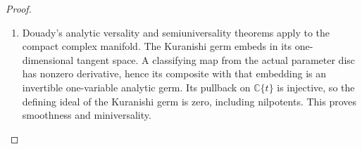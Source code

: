 \begin{proof}
\begin{enumerate}[label=\arabic*.]
\item Douady's analytic versality and semiuniversality theorems
\cite[\S VII.8, pp.~598--599; \S VIII.1, pp.~599--600]{Douady1974} apply to the
compact complex manifold. The Kuranishi germ embeds in its
one-dimensional tangent space. A classifying map from the
actual parameter disc has nonzero derivative, hence its
composite with that embedding is an invertible one-variable
analytic germ. Its pullback on $\mathbb C\{t\}$ is injective,
so the defining ideal of the Kuranishi germ is zero, including
nilpotents. This proves smoothness and miniversality.

\end{enumerate}
\end{proof}
